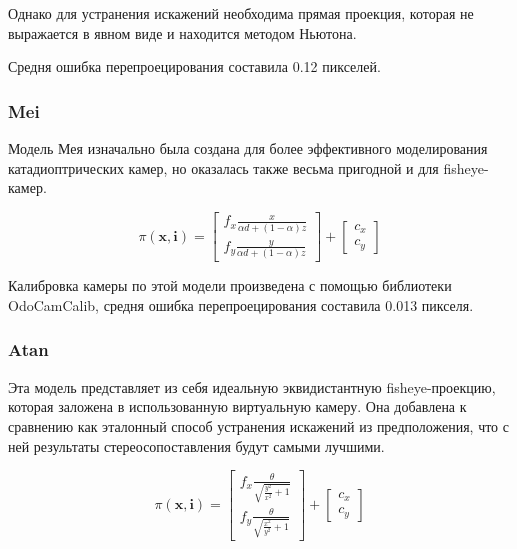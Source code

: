 Однако для устранения искажений необходима прямая проекция, которая не выражается в явном виде  и находится методом 
Ньютона. 

Средня ошибка перепроецирования составила 0.12 пикселей. %

\subsubsection{Mei}

Модель Мея \cite{mei} изначально была создана для более эффективного моделирования катадиоптрических камер, но оказалась также весьма
пригодной и для fisheye-камер. 

\begin{equation}
\pi(\mathbf{x}, \mathbf{i})=\left[\begin{array}{l}
	f_{x} \frac{x}{\alpha d+(1-\alpha) z} \\
	f_{y} \frac{y}{\alpha d+(1-\alpha) z}
	\end{array}\right]+\left[\begin{array}{l}
	c_{x} \\
	c_{y}
	\end{array}\right]
\end{equation}

Калибровка камеры по этой модели произведена с помощью библиотеки OdoCamCalib, средня ошибка перепроецирования 
составила 0.013 пикселя.

\subsubsection{Atan}

Эта модель представляет из себя идеальную эквидистантную fisheye-проекцию, которая заложена в использованную виртуальную камеру. 
Она добавлена к сравнению как эталонный способ устранения искажений из предположения, что с ней результаты стереосопоставления будут 
самыми лучшими.  

\begin{equation}
	\pi(\mathbf{x}, \mathbf{i})=\left[\begin{array}{l}
		f_{x} \frac{\theta}{ \sqrt{ \frac{y^2}{x^2} + 1 }} \\
		f_{y} \frac{\theta}{ \sqrt{ \frac{x^2}{y^2} + 1 }}
		\end{array}\right]+\left[\begin{array}{l}
		c_{x} \\
		c_{y}
		\end{array}\right]
	\end{equation}


